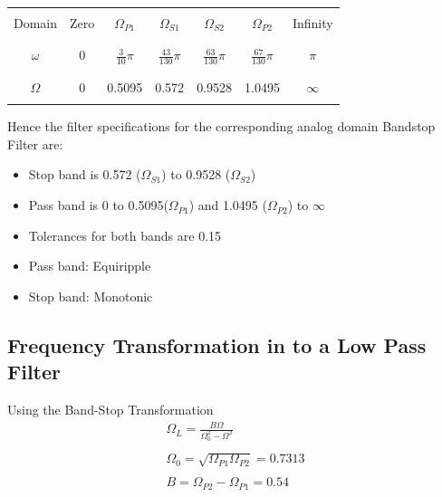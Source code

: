\documentclass[12pt]{article}
\begin{document}
	\begin{center}
		\begin{tabular}{ |c|c|c|c|c|c|c| }
			\hline
			&&&&&&\\
			Domain & Zero & $\Omega_{P1}$ & $\Omega_{S1}$ &$\Omega_{S2}$& $\Omega_{P2}$& Infinity\\
			&&&&&&\\
			\hline
			&&&&&&\\
			$\omega$ & 0 & $\frac{3}{10}\pi$ & $\frac{43}{130}\pi$& $\frac{63}{130}\pi$& $\frac{67}{130}\pi$& $\pi$\\
			&&&&&&\\
			\hline
			&&&&&&\\
			$\Omega$ & 0 & 0.5095 & 0.572 & 0.9528 & 1.0495 & $\infty$\\
			&&&&&&\\
			\hline
		\end{tabular}
	\end{center}
	
	\noindent Hence the filter specifications for the corresponding analog domain Bandstop Filter are:
	\begin{itemize}
		\item Stop band is 0.572 ($\Omega_{S1}$)  to 0.9528 ($\Omega_{S2}$) 
		\item Pass band is 0 to 0.5095($\Omega_{P1}$) and 1.0495 ($\Omega_{P2}$) to $\infty$
		\item Tolerances for both bands are 0.15
		\item Pass band: Equiripple
		\item Stop band: Monotonic
	\end{itemize}
	
	\color{cyan}
	\subsection{Frequency Transformation in to a Low Pass Filter}
	\color{black}
	Using the Band-Stop Transformation
	\begin{gather*}
		\Omega_L = \frac{B\Omega}{\Omega_0^2 - \Omega^2}\\\\
		\Omega_0 = \sqrt{\Omega_{P1} \Omega_{P2}} = 0.7313\\\\
		B = \Omega_{P2} - \Omega_{P1} = 0.54
	\end{gather*}
	
\end{document}
